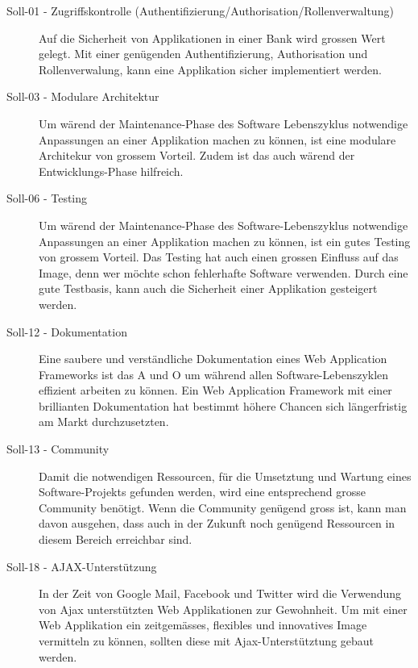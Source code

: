   \begin{description}
  \item[Soll-01 - Zugriffskontrolle 
  (Authentifizierung/Authorisation/Rollenverwaltung)]
  Auf die Sicherheit von Applikationen in einer Bank wird grossen Wert
  gelegt. Mit einer genügenden Authentifizierung, Authorisation und
  Rollenverwalung, kann eine Applikation sicher implementiert werden.
  
  \item[Soll-03 - Modulare Architektur]
  Um wärend der Maintenance-Phase des Software Lebenszyklus notwendige
  Anpassungen an einer Applikation machen zu können, ist eine modulare
  Architekur von grossem Vorteil. Zudem ist das auch wärend der
  Entwicklungs-Phase hilfreich.
  
  \item[Soll-06 - Testing]
  Um wärend der Maintenance-Phase des Software-Lebenszyklus notwendige
  Anpassungen an einer Applikation machen zu können, ist ein gutes Testing von
  grossem Vorteil. Das Testing hat auch einen grossen Einfluss auf das Image,
  denn wer möchte schon fehlerhafte Software verwenden. Durch eine gute
  Testbasis, kann auch die Sicherheit einer Applikation gesteigert werden.
  
  \item[Soll-12 - Dokumentation]
  Eine saubere und verständliche Dokumentation eines Web Application Frameworks
  ist das A und O um während allen Software-Lebenszyklen effizient arbeiten zu
  können. Ein Web Application Framework mit einer brillianten Dokumentation hat
  bestimmt höhere Chancen sich längerfristig am Markt durchzusetzten.
  
  \item[Soll-13 - Community]
  Damit die notwendigen Ressourcen, für die Umsetztung und Wartung eines
  Software-Projekts gefunden werden, wird eine entsprechend grosse Community
  benötigt. Wenn die Community genügend gross ist, kann man davon ausgehen,
  dass auch in der Zukunft noch genügend Ressourcen in diesem Bereich
  erreichbar sind.
  
  \item[Soll-18 - AJAX-Unterstützung]
  In der Zeit von Google Mail, Facebook und Twitter wird die Verwendung von
  \ac{Ajax} unterstützten Web Applikationen zur Gewohnheit. Um mit einer Web
  Applikation ein zeitgemässes, flexibles und innovatives Image vermitteln zu
  können, sollten diese mit Ajax-Unterstütztung gebaut werden.
  
  \end{description}
  
